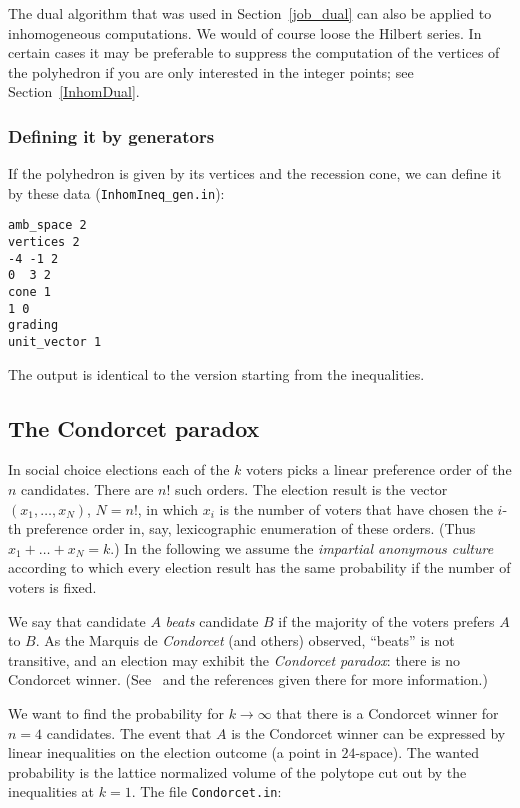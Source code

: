 \documentclass[12pt,a4paper]{scrartcl}
\theoremstyle{definition}
\begin{document}
The dual algorithm that was used in Section~\ref{job_dual} can also be applied to inhomogeneous computations. We would of course loose the Hilbert series. In certain cases it may be preferable to suppress the computation of the vertices of the polyhedron if you are only interested in the integer points; see Section~\ref{InhomDual}.

\subsubsection{Defining it by generators}\label{polyh_ex}

If the polyhedron is given by its vertices and the recession cone, we can define it by these data (\verb|InhomIneq_gen.in|):
\begin{Verbatim}
amb_space 2
vertices 2
-4 -1 2
0  3 2
cone 1
1 0
grading
unit_vector 1
\end{Verbatim}
The output is identical to the version starting from the inequalities.

\subsection{The Condorcet paradox}\label{Condorcet}

In social choice elections each of the $k$ voters picks a linear preference order of the $n$ candidates. There are $n!$ such orders. The election result is the vector $(x_1,\dots,x_N)$, $N=n!$, in which $x_i$ is the number of voters that have chosen the $i$-th preference order in, say, lexicographic enumeration of these orders. (Thus $x_1+\dots+x_N=k$.) In the following we assume the \emph{impartial anonymous culture} according to which every election result has the same probability if the number of voters is fixed.
\medskip

We say that candidate $A$ \emph{beats} candidate $B$ if the majority of the voters prefers $A$ to $B$. As the Marquis de \emph{Condorcet} (and others) observed, ``beats'' is not transitive, and an election may exhibit the \emph{Condorcet paradox}: there is no Condorcet winner. (See~\cite{BS} and the references given there for more information.)

We want to find the probability for $k\to\infty$ that there is a Condorcet winner for $n=4$ candidates. The event that $A$ is the Condorcet winner can be expressed by linear inequalities on the election outcome (a point in $24$-space). The wanted probability is the lattice normalized volume of the polytope cut out by the inequalities at $k=1$. The file \verb|Condorcet.in|:
\end{document}
